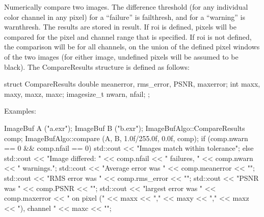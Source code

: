  

Numerically compare two images.  The difference threshold (for any
individual color channel in any pixel) for a ``failure'' is
{\cf failthresh}, and for a ``warning'' is {\cf warnthresh}.  The 
results are stored in {\cf result}.  If {\cf roi} is defined, pixels
will be compared for the pixel and channel range that is specified.  If
{\cf roi} is not defined, the comparison will be for all channels, on
the union of the defined pixel windows of the two images (for either
image, undefined pixels will be assumed to be black).  The 
{\cf CompareResults} structure is defined as follows:
\begin{code}
struct CompareResults {
    double meanerror, rms_error, PSNR, maxerror;
    int maxx, maxy, maxz, maxc;
    imagesize_t nwarn, nfail;
};
\end{code}

\smallskip
\noindent Examples:
\begin{code}
    ImageBuf A ("a.exr");
    ImageBuf B ("b.exr");
    ImageBufAlgo::CompareResults comp;
    ImageBufAlgo::compare (A, B, 1.0f/255.0f, 0.0f, comp);
    if (comp.nwarn == 0 && comp.nfail == 0) {
        std::cout << "Images match within tolerance\n";
    } else {
        std::cout << "Image differed: " << comp.nfail << " failures, "
                  << comp.nwarn << " warnings.\n";
        std::cout << "Average error was " << comp.meanerror << "\n";
        std::cout << "RMS error was " << comp.rms_error << "\n";
        std::cout << "PSNR was " << comp.PSNR << "\n";
        std::cout << "largest error was " << comp.maxerror 
                  << " on pixel (" << maxx << "," << maxy << "," << maxz
                  << "), channel " << maxc << "\n";
    }
\end{code}
\apiend


\begin{comment}
 compare_Yee is a bit half-baked. Leave it out of the
  docs for now.  FIXME

\apiitem{int {\ce compare_Yee} (const ImageBuf \&A, const ImageBuf \&B, \\
  \bigspc CompareResults \&result, float luminance, float fov, \\
   \bigspc  ROI roi=ROI::All(), nthreads=0)}
\index{ImageBufAlgo!compare_Yee} \indexapi{compare_Yee}
\apiend
\end{comment}


